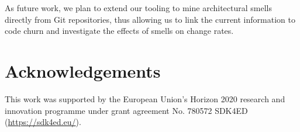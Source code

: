 
As future work, we plan to extend our tooling to mine architectural smells directly from Git repositories, thus allowing us to link the current information to code churn and investigate the effects of smells on change rates.

\section*{Acknowledgements}
This work was supported by the European Union's Horizon 2020 research and innovation programme under grant agreement No. 780572 SDK4ED (\url{https://sdk4ed.eu/}).

